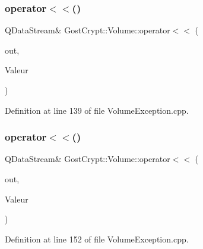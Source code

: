 \mbox{\label{namespace_gost_crypt_1_1_volume_a1e8cf928585ecda1b8bacaa453abbdfc}} 
\subsubsection{\texorpdfstring{operator$<$$<$()}{operator<<()}\hspace{0.1cm}{\footnotesize\ttfamily [10/19]}}
{\footnotesize\ttfamily Q\+Data\+Stream\& Gost\+Crypt\+::\+Volume\+::operator$<$$<$ (\begin{DoxyParamCaption}\item[{Q\+Data\+Stream \&}]{out,  }\item[{const \hyperlink{class_gost_crypt_1_1_volume_1_1_volume_protected}{Gost\+Crypt\+::\+Volume\+::\+Volume\+Protected} \&}]{Valeur }\end{DoxyParamCaption})}



Definition at line 139 of file Volume\+Exception.\+cpp.

\mbox{\label{namespace_gost_crypt_1_1_volume_a497c0100f1aeadf02215ddfc1819da61}} 
\subsubsection{\texorpdfstring{operator$<$$<$()}{operator<<()}\hspace{0.1cm}{\footnotesize\ttfamily [11/19]}}
{\footnotesize\ttfamily Q\+Data\+Stream\& Gost\+Crypt\+::\+Volume\+::operator$<$$<$ (\begin{DoxyParamCaption}\item[{Q\+Data\+Stream \&}]{out,  }\item[{const \hyperlink{class_gost_crypt_1_1_volume_1_1_volume_corrupted}{Gost\+Crypt\+::\+Volume\+::\+Volume\+Corrupted} \&}]{Valeur }\end{DoxyParamCaption})}



Definition at line 152 of file Volume\+Exception.\+cpp.

\mbox{\label{namespace_gost_crypt_1_1_volume_a600566c38b817173ce7a12607d514c7a}} 
